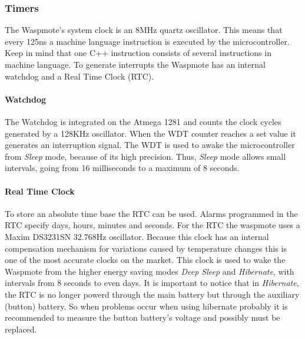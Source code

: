 \subsubsection{Timers}
The Waspmote's system clock is an 8MHz quartz oscillator. This means that every 125ns a machine language instruction is executed by the microcontroller. Keep in mind that one C++ instruction consists of several instructions in machine language. To generate interrupts the Waspmote has an internal watchdog and a Real Time Clock (RTC).
\paragraph{Watchdog}
The Watchdog is integrated on the Atmega 1281 and counts the clock cycles generated by a 128KHz oscillator. When the WDT counter reaches a set value it generates an interruption signal. The WDT is used to awake the microcontroller from \textit{Sleep} mode, because of its high precision. Thus, \textit{Sleep} mode allows small intervals, going from 16 milliseconds to a maximum of 8 seconds.
\paragraph{Real Time Clock}
To store an absolute time base the RTC can be used. Alarms programmed in the RTC specify days, hours, minutes and seconds. For the RTC the waspmote uses a Maxim DS3231SN 32.768Hz oscillator. Because this clock has an internal compensation mechanism for variations caused by temperature changes this is one of the most accurate clocks on the market. This clock is used to wake the Waspmote from the higher energy saving modes \textit{Deep Sleep} and \textit{Hibernate}, with intervals from 8 seconds to even days. It is important to notice that in \textit{Hibernate}, the RTC is no longer powerd through the main battery but through the auxiliary (button) battery. So when problems occur when using hibernate probably it is recommended to measure the button battery's voltage and possibly must be replaced.

